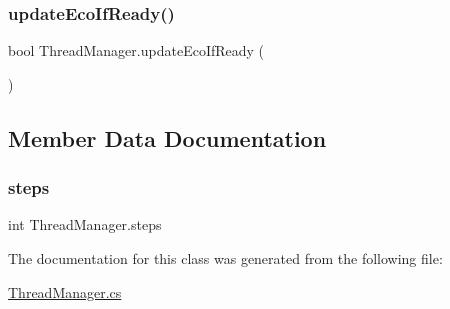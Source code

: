 \subsubsection{\texorpdfstring{update\+Eco\+If\+Ready()}{updateEcoIfReady()}}
{\footnotesize\ttfamily bool Thread\+Manager.\+update\+Eco\+If\+Ready (\begin{DoxyParamCaption}{ }\end{DoxyParamCaption})}



\subsection{Member Data Documentation}
\mbox{\label{class_thread_manager_a2a86413c99cfa790288f86dec82ea06a}} 
\subsubsection{\texorpdfstring{steps}{steps}}
{\footnotesize\ttfamily int Thread\+Manager.\+steps}



The documentation for this class was generated from the following file\+:\begin{DoxyCompactItemize}
\item 
\mbox{\hyperlink{_thread_manager_8cs}{Thread\+Manager.\+cs}}\end{DoxyCompactItemize}
